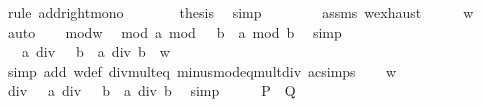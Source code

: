 \begin{isabellebody}
\ {\isacharparenleft}{\kern0pt}rule\ add{\isacharunderscore}{\kern0pt}right{\isacharunderscore}{\kern0pt}mono{\isacharparenright}{\kern0pt}\isanewline
\ \ \ \ \isamarkupfalse%
\ \isamarkupfalse%
\ {\isacharquery}{\kern0pt}thesis\ \isamarkupfalse%
\ simp\isanewline
\ \ \isamarkupfalse%
\isanewline
\ \ \isamarkupfalse%
\ \isamarkupfalse%
\ assms\ w{\isacharunderscore}{\kern0pt}exhaust\isanewline
\ \ \isamarkupfalse%
\ \isamarkupfalse%
\ {\isachardoublequoteopen}w\ {\isacharequal}{\kern0pt}\ {}{\isachardoublequoteclose}\ \isamarkupfalse%
\ auto\isanewline
\ \ \isamarkupfalse%
\ mod{\isacharunderscore}{\kern0pt}w\ \isamarkupfalse%
\ mod{\isacharcolon}{\kern0pt}\ {\isachardoublequoteopen}a\ mod\ {\isacharparenleft}{\kern0pt}{}\ {\isacharasterisk}{\kern0pt}\ b{\isacharparenright}{\kern0pt}\ {\isacharequal}{\kern0pt}\ a\ mod\ b{\isachardoublequoteclose}\ \isamarkupfalse%
\ simp\isanewline
\ \ \isamarkupfalse%
\ {\isachardoublequoteopen}{}\ {\isacharasterisk}{\kern0pt}\ {\isacharparenleft}{\kern0pt}a\ div\ {\isacharparenleft}{\kern0pt}{}\ {\isacharasterisk}{\kern0pt}\ b{\isacharparenright}{\kern0pt}{\isacharparenright}{\kern0pt}\ {\isacharequal}{\kern0pt}\ a\ div\ b\ {\isacharminus}{\kern0pt}\ w{\isachardoublequoteclose}\isanewline
\ \ \ \ \isamarkupfalse%
\ {\isacharparenleft}{\kern0pt}simp\ add{\isacharcolon}{\kern0pt}\ w{\isacharunderscore}{\kern0pt}def\ div{\isacharunderscore}{\kern0pt}mult{}{\isacharunderscore}{\kern0pt}eq\ minus{\isacharunderscore}{\kern0pt}mod{\isacharunderscore}{\kern0pt}eq{\isacharunderscore}{\kern0pt}mult{\isacharunderscore}{\kern0pt}div\ ac{\isacharunderscore}{\kern0pt}simps{\isacharparenright}{\kern0pt}\isanewline
\ \ \isamarkupfalse%
\ {\isacartoucheopen}w\ {\isacharequal}{\kern0pt}\ {}{\isacartoucheclose}\ \isamarkupfalse%
\ div{\isacharcolon}{\kern0pt}\ {\isachardoublequoteopen}{}\ {\isacharasterisk}{\kern0pt}\ {\isacharparenleft}{\kern0pt}a\ div\ {\isacharparenleft}{\kern0pt}{}\ {\isacharasterisk}{\kern0pt}\ b{\isacharparenright}{\kern0pt}{\isacharparenright}{\kern0pt}\ {\isacharequal}{\kern0pt}\ a\ div\ b{\isachardoublequoteclose}\ \isamarkupfalse%
\ simp\isanewline
\ \ \isamarkupfalse%
\ \isamarkupfalse%
\ {\isacharquery}{\kern0pt}P\ \ {\isacharquery}{\kern0pt}Q\isanewline

\end{isabellebody}
